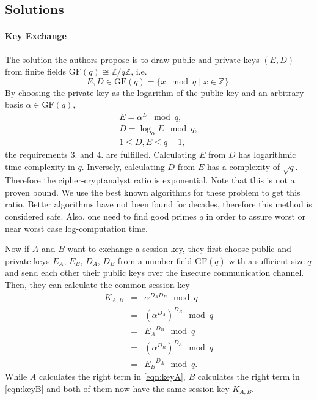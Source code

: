 \documentclass[paper=a4, fontsize=11pt]{scrartcl} %
\numberwithin{equation}{section} %
\numberwithin{figure}{section} %
\numberwithin{table}{section} %
\begin{document}
\subsection{Solutions}
\paragraph{Key Exchange}
The solution the authors propose is to draw public and private keys $(E,D)$ from finite fields $\mathrm{GF}(q)\cong\mathbb{Z}/q\mathbb{Z}$, i.e.
\begin{equation}
E, D \in \mathrm{GF}(q) = \{x \mod q \mid x \in \mathbb{Z}\}.
\end{equation}
By choosing the private key as the logarithm of the public key and an arbitrary basis $\alpha \in \mathrm{GF}(q)$,
\begin{eqnarray}
E = \alpha^D\mod q,\\
D = \log_\alpha E \mod q,\\
1 \leq D,E \leq q-1,
\end{eqnarray}
the requirements 3. and 4. are fulfilled. Calculating $E$ from $D$ has logarithmic time complexity in $q$. Inversely, calculating $D$ from $E$ has a complexity of $\sqrt{q}$. Therefore the cipher-cryptanalyst ratio is exponential. Note that this is not a proven bound. We use the best known algorithms for these problem to get this ratio. Better algorithms have not been found for decades, therefore this method is considered safe. Also, one need to find good primes $q$ in order to assure worst or near worst case log-computation time.

Now if $A$ and $B$ want to exchange a session key, they first choose public and private keys $E_A$, $E_B$, $D_A$, $D_B$ from a number field $\mathrm{GF}(q)$ with a sufficient size $q$ and send each other their public keys over the insecure communication channel. Then, they can calculate the common session key
\begin{eqnarray}
K_{A,B} & = & \alpha^{D_AD_B} \mod q\\
& = & (\alpha^{D_A})^{D_B} \mod q\\
& = & {E_A}^{D_B} \mod q\label{eqn:keyA}\\
& = & (\alpha^{D_B})^{D_A} \mod q\\
& = & {E_B}^{D_A} \mod q.\label{eqn:keyB}
\end{eqnarray}
While $A$ calculates the right term in \ref{eqn:keyA}, $B$ calculates the right term in \ref{eqn:keyB} and both of them now have the same session key $K_{A,B}$.
\end{document}
